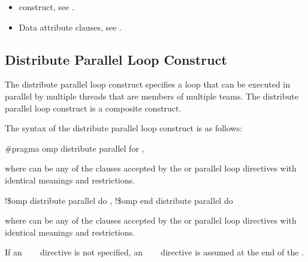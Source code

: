 {{{{\begin{itemize}
\item {} construct, see 
.

\item Data attribute clauses, see 
.
\end{itemize}









\subsection{Distribute Parallel Loop Construct}
\label{subsec:Distribute Parallel Loop Construct}
\summary
The distribute parallel loop construct specifies a loop that can be executed in parallel by 
multiple threads that are members of multiple teams. The distribute parallel loop construct is a composite construct.

\syntax
The syntax of the distribute parallel loop construct is as follows:

\ccppspecificstart
\begin{boxedcode}
\#pragma omp distribute parallel for \plc{[clause[ [},\plc{] clause] ... ] newline}
\end{boxedcode}

where  can be any of the clauses accepted by the  or parallel loop 
directives with identical meanings and restrictions.
\ccppspecificend

\fortranspecificstart
\begin{boxedcode}
!\$omp distribute parallel do \plc{[clause[ [},\plc{] clause] ... ]}
\plc{[}!\$omp end distribute parallel do\plc{]}
\end{boxedcode}

where  can be any of the clauses accepted by the  or parallel loop 
directives with identical meanings and restrictions.

If an ~~~ directive is not specified, an 
~~~ directive is assumed at the end of the .
\fortranspecificend

}}}}
